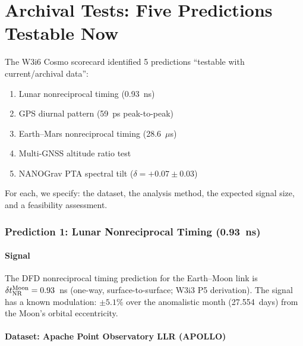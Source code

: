 \documentclass[11pt]{article}
\begin{document}
\newpage

\part{Archival Tests: Five Predictions Testable Now}
\label{part:archival}

The W3i6 Cosmo scorecard identified 5 predictions ``testable with
current/archival data'':
\begin{enumerate}[nosep]
\item Lunar nonreciprocal timing (0.93~ns)
\item GPS diurnal pattern (59~ps peak-to-peak)
\item Earth--Mars nonreciprocal timing (28.6~$\mu$s)
\item Multi-GNSS altitude ratio test
\item NANOGrav PTA spectral tilt ($\delta = +0.07 \pm 0.03$)
\end{enumerate}

For each, we specify: the dataset, the analysis method, the expected
signal size, and a feasibility assessment.

\section{Prediction 1: Lunar Nonreciprocal Timing (0.93~ns)}
\label{sec:archival-lunar}

\subsection{Signal}

The DFD nonreciprocal timing prediction for the Earth--Moon link is
$\delta t_{\rm NR}^{\rm Moon} = 0.93$~ns (one-way, surface-to-surface;
W3i3 P5 derivation). The signal has a known modulation: $\pm 5.1\%$
over the anomalistic month (27.554~days) from the Moon's orbital
eccentricity.

\subsection{Dataset: Apache Point Observatory LLR (APOLLO)}
\end{document}
